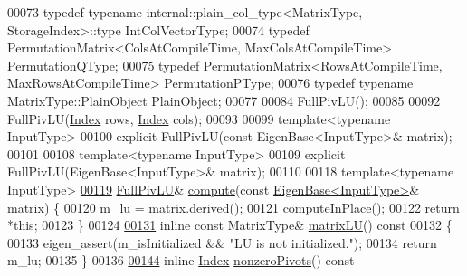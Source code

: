 \begin{DoxyCode}
00073     \textcolor{keyword}{typedef} \textcolor{keyword}{typename} internal::plain\_col\_type<MatrixType, StorageIndex>::type IntColVectorType;
00074     \textcolor{keyword}{typedef} PermutationMatrix<ColsAtCompileTime, MaxColsAtCompileTime> PermutationQType;
00075     \textcolor{keyword}{typedef} PermutationMatrix<RowsAtCompileTime, MaxRowsAtCompileTime> PermutationPType;
00076     \textcolor{keyword}{typedef} \textcolor{keyword}{typename} MatrixType::PlainObject PlainObject;
00077 
00084     FullPivLU();
00085 
00092     FullPivLU(\hyperlink{namespace_eigen_a62e77e0933482dafde8fe197d9a2cfde}{Index} rows, \hyperlink{namespace_eigen_a62e77e0933482dafde8fe197d9a2cfde}{Index} cols);
00093 
00099     \textcolor{keyword}{template}<\textcolor{keyword}{typename} InputType>
00100     \textcolor{keyword}{explicit} FullPivLU(\textcolor{keyword}{const} EigenBase<InputType>& matrix);
00101 
00108     \textcolor{keyword}{template}<\textcolor{keyword}{typename} InputType>
00109     \textcolor{keyword}{explicit} FullPivLU(EigenBase<InputType>& matrix);
00110 
00118     \textcolor{keyword}{template}<\textcolor{keyword}{typename} InputType>
\hyperlink{group___l_u___module_a0a3c3b1bbafa31a03567a4573ebabc79}{00119}     \hyperlink{group___l_u___module_class_eigen_1_1_full_piv_l_u}{FullPivLU}& \hyperlink{group___l_u___module_a0a3c3b1bbafa31a03567a4573ebabc79}{compute}(\textcolor{keyword}{const} \hyperlink{group___core___module_struct_eigen_1_1_eigen_base}{EigenBase<InputType>}& matrix) \{
00120       m\_lu = matrix.\hyperlink{group___core___module_a324b16961a11d2ecfd2d1b7dd7946545}{derived}();
00121       computeInPlace();
00122       \textcolor{keywordflow}{return} *\textcolor{keyword}{this};
00123     \}
00124 
\hyperlink{group___l_u___module_afea0b8fc707a9097d46fe358cb18bbff}{00131}     \textcolor{keyword}{inline} \textcolor{keyword}{const} MatrixType& \hyperlink{group___l_u___module_afea0b8fc707a9097d46fe358cb18bbff}{matrixLU}()\textcolor{keyword}{ const}
00132 \textcolor{keyword}{    }\{
00133       eigen\_assert(m\_isInitialized && \textcolor{stringliteral}{"LU is not initialized."});
00134       \textcolor{keywordflow}{return} m\_lu;
00135     \}
00136 
\hyperlink{group___l_u___module_aa71132a751ad3c78178e33d6b2987400}{00144}     \textcolor{keyword}{inline} \hyperlink{group___core___module_a554f30542cc2316add4b1ea0a492ff02}{Index} \hyperlink{group___l_u___module_aa71132a751ad3c78178e33d6b2987400}{nonzeroPivots}()\textcolor{keyword}{ const}

\end{DoxyCode}
